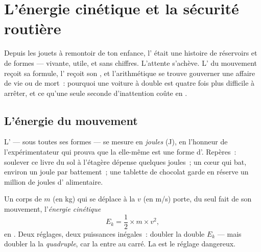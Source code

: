 \chapter{L'énergie cinétique et la sécurité routière}\label{ch:g9:kinetic-energy-safety}

Depuis les jouets à remontoir de ton enfance, l' était une
histoire de réservoirs et de formes --- vivante, utile, et sans
chiffres. L'attente s'achève. L' du mouvement reçoit sa
formule, l' reçoit son , et l'arithmétique se trouve
gouverner une affaire de vie ou de mort~: pourquoi une voiture à
 double est quatre fois plus difficile à arrêter, et ce qu'une
seule seconde d'inattention coûte en .

\section{L'énergie du mouvement}

\begin{definition}[Le joule]\label{def:g9:kinetic-energy-safety:joule}
L' --- sous toutes ses formes --- se mesure en
\emph{joules} (\unit{J}), en l'honneur de
l'expérimentateur qui prouva que la  elle-même est une forme
d'. Repères~: soulever ce livre du sol à l'étagère dépense
quelques joules~; un cœur qui bat, environ un joule par battement~;
une tablette de chocolat garde en réserve un million de joules
d' alimentaire.
\end{definition}

\begin{proposition}\label{prop:g9:kinetic-energy-safety:formula}
Un corps de  $m$ (en \unit{kg}) qui se déplace à la  $v$
(en \unit{m/s}) porte, du seul fait de son mouvement,
l'\emph{énergie cinétique}
\[
E_k = \frac{1}{2} \times m \times v^2 ,
\]
en . Deux réglages, deux puissances inégales~: doubler la 
double $E_k$ --- mais doubler la \emph{} la
\emph{quadruple}, car la  entre au carré. La  est le
réglage dangereux.
\end{proposition}


